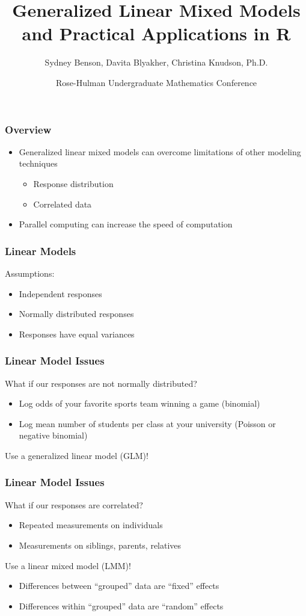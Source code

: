 \documentclass{beamer}
\title{Generalized Linear Mixed Models and Practical Applications in R}
\author{Sydney Benson, Davita Blyakher, Christina Knudson, Ph.D.}
\institute{University of St. Thomas}
\date{Rose-Hulman Undergraduate Mathematics Conference}
\begin{document}
\frame{\titlepage}

\begin{frame}
\frametitle{Overview}

\begin{itemize}
    \item[] Generalized linear mixed models can overcome limitations of other modeling techniques
    \begin{itemize}
        \item Response distribution
        \item Correlated data
    \end{itemize}
    \item[] Parallel computing can increase the speed of computation
\end{itemize}

\end{frame}

\begin{frame}
\frametitle{Linear Models}

Assumptions:
\begin{itemize}
    \item Independent responses
    \item Normally distributed responses
    \item Responses have equal variances
\end{itemize}

\end{frame}

\begin{frame}
\frametitle{Linear Model Issues}

What if our responses are not normally distributed?
\begin{itemize}
    \item Log odds of your favorite sports team winning a game (binomial)
    \item Log mean number of students per class at your university (Poisson or negative binomial)
\end{itemize}
\vspace{.5cm}
\pause
Use a generalized linear model (GLM)!

\end{frame}

\begin{frame}
\frametitle{Linear Model Issues}

What if our responses are correlated?
\begin{itemize}
    \item Repeated measurements on individuals
    \item Measurements on siblings, parents, relatives
\end{itemize}
\vspace{.5cm}
\pause
Use a linear mixed model (LMM)!
\begin{itemize}
    \item Differences between ``grouped'' data are ``fixed'' effects
    \item Differences within ``grouped'' data are ``random'' effects
\end{itemize}

\end{frame}
\end{document}
